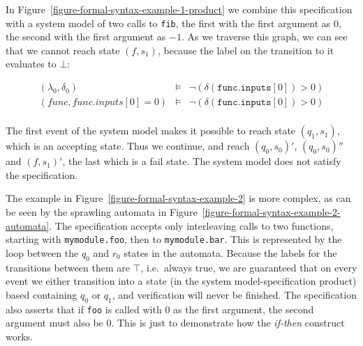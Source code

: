 In Figure~\ref{figure-formal-syntax-example-1-product} we combine this
specification with a system model of two calls to \texttt{fib}, the first with
the first argument as $0$, the second with the first argument as $-1$. As we
traverse this graph, we can see that we cannot reach state $(f, s_1)$, because
the label on the transition to it evaluates to $\bot$:

\medskip
\[
  \begin{array}{rcl}
    (\lambda_0, \delta_0) & \models & \neg (\delta(\texttt{func.inputs$[0]$}) > 0) \\
    (\textit{func}, \textit{func.inputs}[0] = 0) & \models & \neg (\delta(\texttt{func.inputs$[0]$}) > 0) \\
  \end{array}
\]
\medskip

The first event of the system model makes it possible to reach state
$(q_1,s_1)$, which is an accepting state. Thus we continue, and reach
$(q_0,s_0)'$, $(q_0,s_0)''$ and $(f,s_1)'$, the last which is a fail state. The
system model does not satisfy the specification.

The example in Figure~\ref{figure-formal-syntax-example-2} is more complex, as
can be seen by the sprawling automata in
Figure~\ref{figure-formal-syntax-example-2-automata}. The specification accepts
only interleaving calls to two functions, starting with \texttt{mymodule.foo},
then to \texttt{mymodule.bar}. This is represented by the loop between the
$q_0$ and $r_0$ states in the automata. Because the labels for the transitions
between them are $\top$, i.e.\ always true, we are guaranteed that on every
event we either transition into a state (in the system model-specification
product) based containing $q_0$ or $q_1$, and verification will never be
finished. The specification also asserts that if \texttt{foo} is called with
$0$ as the first argument, the second argument must also be $0$.  This is just
to demonstrate how the \textit{if-then} construct works.



